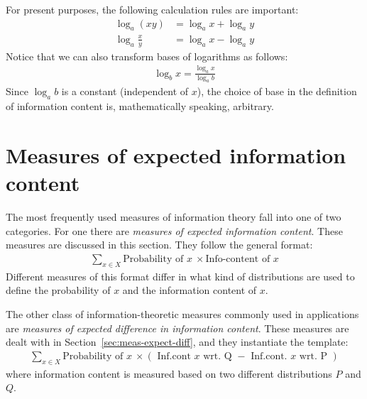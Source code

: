 \documentclass[nobib,nofonts]{tufte-handout}
\begin{document}
For present purposes, the following calculation rules are important:
\begin{align*}
  \log_{a}( x y ) & = \log_{a} x + \log_{a} y \\
  \log_{a} \frac{x}{y} & = \log_{a} x - \log_{a} y
\end{align*}
Notice that we can also transform bases of logarithms as follows:
\begin{align*}
  \log_{b} x = \frac{\log_{a} x}{\log_{a} b}
\end{align*}
Since $\log_{a} b$ is a constant (independent of $x$), the choice of base in the definition of information content is, mathematically speaking, arbitrary.


\section{Measures of expected information content}

The most frequently used measures of information theory fall into one of two categories.
For one there are \emph{measures of expected information content}.
These measures are discussed in this section.
They follow the general format:
\begin{align*}
  \sum_{x \in X} \text{Probability of } x \ \times \text{Info-content of } x
\end{align*}
Different measures of this format differ in what kind of distributions are used to define the probability of $x$ and the information content of $x$.

The other class of information-theoretic measures commonly used in applications are \emph{measures of expected difference in information content}.
These measures are dealt with in Section~\ref{sec:meas-expect-diff}, and they instantiate the template:
\begin{align*}
  \sum_{x \in X} \text{Probability of } x \ \times (\text{ Inf.cont } x \text{ wrt. Q } - \text{ Inf.cont. } x \text{ wrt. P })
\end{align*}
where information content is measured based on two different distributions $P$ and $Q$.
\end{document}
